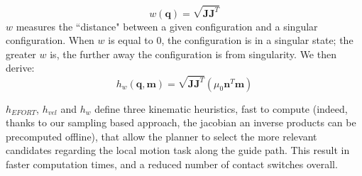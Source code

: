 \begin{equation*} \label{ellipsoid}
w(\mathbf{q}) = \sqrt{\mathbf{J}\mathbf{J}^T}
\end{equation*}
$w$ measures the ``distance" between a given configuration and a singular configuration. When $w$ is equal to 0, the configuration is in a singular state;
the greater $w$ is, the further away the configuration is from singularity.
We then derive:
\begin{equation}
h_{w}(\mathbf{q}, \mathbf{m}) = \sqrt{\mathbf{J}\mathbf{J}^T} ( \mu_0 \mathbf{n}^T \mathbf{m})
\end{equation}

$h_{EFORT}$, $h_{vel}$ and $h_{w}$ define three kinematic heuristics, fast to compute (indeed, thanks to our sampling based approach, the jacobian an inverse products
can be precomputed offline), that allow the planner to select the more relevant
candidates regarding the local motion task along the guide path.
This result in faster computation times, and a reduced number of contact switches overall.



